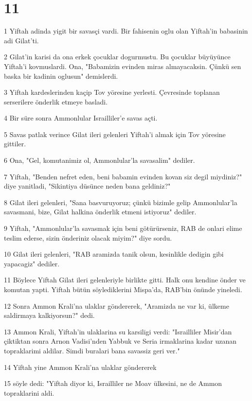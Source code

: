 \chapter{11}

\par 1 Yiftah adinda yigit bir savasçi vardi. Bir fahisenin oglu olan Yiftah'in babasinin adi Gilat'ti.
\par 2 Gilat'in karisi da ona erkek çocuklar dogurmustu. Bu çocuklar büyüyünce Yiftah'i kovmuslardi. Ona, "Babamizin evinden miras almayacaksin. Çünkü sen baska bir kadinin oglusun" demislerdi.
\par 3 Yiftah kardeslerinden kaçip Tov yöresine yerlesti. Çevresinde toplanan serserilere önderlik etmeye basladi.
\par 4 Bir süre sonra Ammonlular Israilliler'e savas açti.
\par 5 Savas patlak verince Gilat ileri gelenleri Yiftah'i almak için Tov yöresine gittiler.
\par 6 Ona, "Gel, komutanimiz ol, Ammonlular'la savasalim" dediler.
\par 7 Yiftah, "Benden nefret eden, beni babamin evinden kovan siz degil miydiniz?" diye yanitladi, "Sikintiya düsünce neden bana geldiniz?"
\par 8 Gilat ileri gelenleri, "Sana basvuruyoruz; çünkü bizimle gelip Ammonlular'la savasmani, bize, Gilat halkina önderlik etmeni istiyoruz" dediler.
\par 9 Yiftah, "Ammonlular'la savasmak için beni götürürseniz, RAB de onlari elime teslim ederse, sizin önderiniz olacak miyim?" diye sordu.
\par 10 Gilat ileri gelenleri, "RAB aramizda tanik olsun, kesinlikle dedigin gibi yapacagiz" dediler.
\par 11 Böylece Yiftah Gilat ileri gelenleriyle birlikte gitti. Halk onu kendine önder ve komutan yapti. Yiftah bütün söylediklerini Mispa'da, RAB'bin önünde yineledi.
\par 12 Sonra Ammon Krali'na ulaklar göndererek, "Aramizda ne var ki, ülkeme saldirmaya kalkiyorsun?" dedi.
\par 13 Ammon Krali, Yiftah'in ulaklarina su karsiligi verdi: "Israilliler Misir'dan çiktiktan sonra Arnon Vadisi'nden Yabbuk ve Seria irmaklarina kadar uzanan topraklarimi aldilar. Simdi buralari bana savassiz geri ver."
\par 14 Yiftah yine Ammon Krali'na ulaklar göndererek
\par 15 söyle dedi: "Yiftah diyor ki, Israilliler ne Moav ülkesini, ne de Ammon topraklarini aldi.
